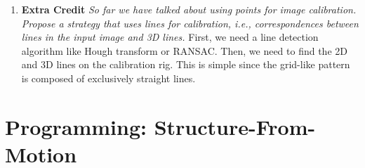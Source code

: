 \documentclass[11pt]{article}
\begin{document}
\begin{enumerate}
        \item \textbf{Extra Credit} \textit{So far we have talked about using points for image calibration. Propose a
        strategy that uses lines for calibration, i.e., correspondences between lines in the input image and 3D
        lines.}\newline
        First, we need a line detection algorithm like Hough transform or RANSAC. Then, we need to find the 2D and 3D
        lines on the calibration rig. This is simple since the grid-like pattern is composed of exclusively straight
        lines.
    \end{enumerate}


    \section{Programming: Structure-From-Motion}
\end{document}
